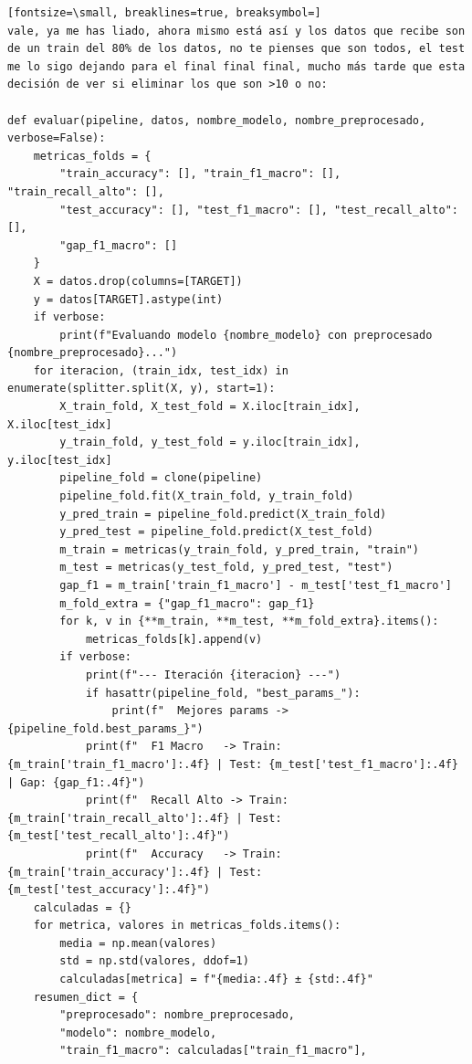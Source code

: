 \documentclass[12pt,a4paper,oneside]{book}
\begin{document}
\begin{iaprompt}
\begin{Verbatim}[fontsize=\small, breaklines=true, breaksymbol=]
vale, ya me has liado, ahora mismo está así y los datos que recibe son de un train del 80% de los datos, no te pienses que son todos, el test me lo sigo dejando para el final final final, mucho más tarde que esta decisión de ver si eliminar los que son >10 o no:

def evaluar(pipeline, datos, nombre_modelo, nombre_preprocesado, verbose=False):
    metricas_folds = {
        "train_accuracy": [], "train_f1_macro": [], "train_recall_alto": [],
        "test_accuracy": [], "test_f1_macro": [], "test_recall_alto": [],
        "gap_f1_macro": []
    }
    X = datos.drop(columns=[TARGET])
    y = datos[TARGET].astype(int)
    if verbose:
        print(f"Evaluando modelo {nombre_modelo} con preprocesado {nombre_preprocesado}...")
    for iteracion, (train_idx, test_idx) in enumerate(splitter.split(X, y), start=1):
        X_train_fold, X_test_fold = X.iloc[train_idx], X.iloc[test_idx]
        y_train_fold, y_test_fold = y.iloc[train_idx], y.iloc[test_idx]
        pipeline_fold = clone(pipeline)
        pipeline_fold.fit(X_train_fold, y_train_fold)
        y_pred_train = pipeline_fold.predict(X_train_fold)
        y_pred_test = pipeline_fold.predict(X_test_fold)
        m_train = metricas(y_train_fold, y_pred_train, "train")
        m_test = metricas(y_test_fold, y_pred_test, "test")
        gap_f1 = m_train['train_f1_macro'] - m_test['test_f1_macro']
        m_fold_extra = {"gap_f1_macro": gap_f1}
        for k, v in {**m_train, **m_test, **m_fold_extra}.items():
            metricas_folds[k].append(v)
        if verbose:
            print(f"--- Iteración {iteracion} ---")
            if hasattr(pipeline_fold, "best_params_"):
                print(f"  Mejores params -> {pipeline_fold.best_params_}")
            print(f"  F1 Macro   -> Train: {m_train['train_f1_macro']:.4f} | Test: {m_test['test_f1_macro']:.4f} | Gap: {gap_f1:.4f}")
            print(f"  Recall Alto -> Train: {m_train['train_recall_alto']:.4f} | Test: {m_test['test_recall_alto']:.4f}")
            print(f"  Accuracy   -> Train: {m_train['train_accuracy']:.4f} | Test: {m_test['test_accuracy']:.4f}")
    calculadas = {}
    for metrica, valores in metricas_folds.items():
        media = np.mean(valores)
        std = np.std(valores, ddof=1)
        calculadas[metrica] = f"{media:.4f} ± {std:.4f}"
    resumen_dict = {
        "preprocesado": nombre_preprocesado,
        "modelo": nombre_modelo,
        "train_f1_macro": calculadas["train_f1_macro"],

\end{Verbatim}
\end{iaprompt}
\end{document}
